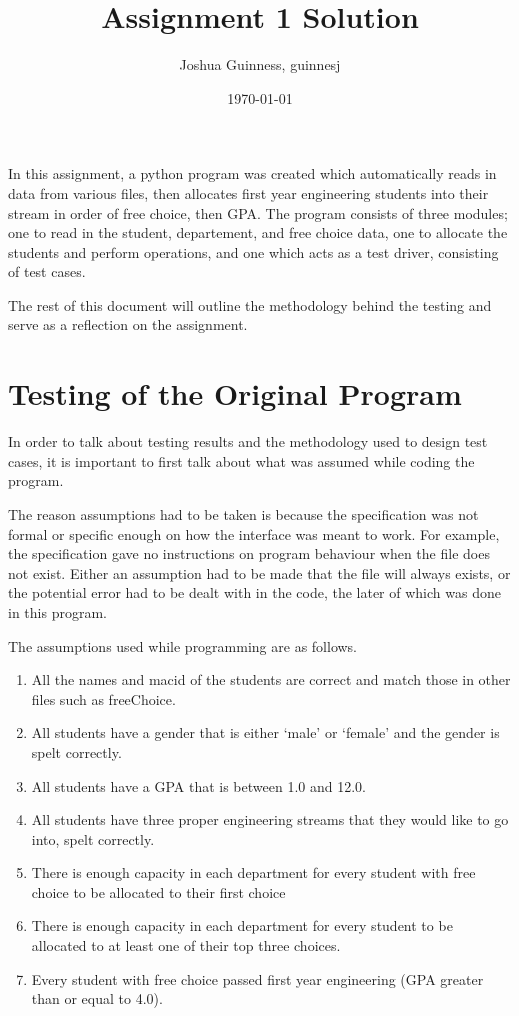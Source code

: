\documentclass[12pt]{article}
\title{Assignment 1 Solution}
\author{Joshua Guinness, guinnesj}
\date{\today}
\begin{document}
\maketitle

In this assignment, a python program was created which automatically reads in data
from various files, then allocates first year engineering students into their
stream in order of free choice, then GPA. The program consists of three modules; 
one to read in the student, departement, and free choice data, one to allocate
the students and perform operations, and one which acts as a test driver, consisting
of test cases.

The rest of this document will outline the methodology behind the testing
and serve as a reflection on the assignment.

\section{Testing of the Original Program}

In order to talk about testing results and the methodology used to design test cases,
it is important to first talk about what was assumed while coding the program.

The reason assumptions had to be taken is because the specification was not formal or
specific enough on how the interface was meant to work. For example, the specification
gave no instructions on program behaviour when the file does not exist. Either
an assumption had to be made that the file will always exists, or the potential
error had to be dealt with in the code, the later of which was done in this program.

The assumptions used while programming are as follows.

\begin{enumerate}
	\item All the names and macid of the students are correct and match those in
	other files such as freeChoice.
	\item All students have a gender that is either `male' or `female' and the 
	gender is spelt correctly.
	\item All students have a GPA that is between 1.0 and 12.0.
	\item All students have three proper engineering streams that they would like
	to go into, spelt correctly.
	\item There is enough capacity in each department for every student with free choice
	to be allocated to their first choice
	\item There is enough capacity in each department for every student to be allocated
	to at least one of their top three choices.
	\item Every student with free choice passed first year engineering (GPA greater than or equal
	to 4.0).
\end{enumerate}
\end{document}
